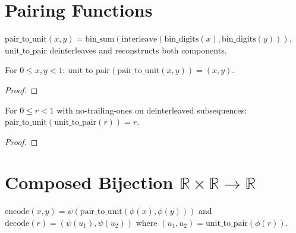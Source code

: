 \section{Pairing Functions}\label{sec:pairing}

\begin{definition}\label{def:pair_to_unit}
  \rocqok
  $\mathrm{pair\_to\_unit}(x, y) =
  \mathrm{bin\_sum}(\mathrm{interleave}(\mathrm{bin\_digits}(x),
  \mathrm{bin\_digits}(y)))$.
  $\mathrm{unit\_to\_pair}$ deinterleaves and reconstructs both components.
\end{definition}

\begin{lemma}\label{lem:pair_to_unitK}
  \rocqok
  For $0 \leq x, y < 1$:
  $\mathrm{unit\_to\_pair}(\mathrm{pair\_to\_unit}(x, y)) = (x, y)$.
\end{lemma}
\begin{proof}\rocqok\end{proof}

\begin{lemma}\label{lem:unit_to_pairK}
  \rocqok
  For $0 \leq r < 1$ with no-trailing-ones on deinterleaved subsequences:
  $\mathrm{pair\_to\_unit}(\mathrm{unit\_to\_pair}(r)) = r$.
\end{lemma}
\begin{proof}\rocqok\end{proof}


\section{Composed Bijection $\mathbb{R} \times \mathbb{R} \to \mathbb{R}$}\label{sec:encode_decode}

\begin{definition}\label{def:encode_decode_RR}
  \rocqok
  $\mathrm{encode}(x, y) = \psi(\mathrm{pair\_to\_unit}(\phi(x), \phi(y)))$
  and
  $\mathrm{decode}(r) = (\psi(u_1), \psi(u_2))$ where
  $(u_1, u_2) = \mathrm{unit\_to\_pair}(\phi(r))$.
\end{definition}

